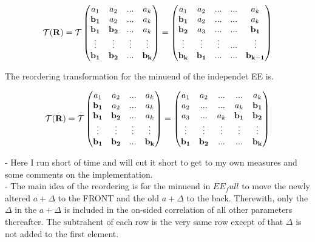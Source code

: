 \documentclass[a4paper,12pt]{article}
\begin{document}
\begin{align}
\mathcal{T}({\bold{R}}) =
\mathcal{T}
\begin{pmatrix}
a_1 & a_2 & ... & a_k \\
\bold{b_1} & a_2 & ... & a_k \\
\bold{b_1} & \bold{b_2} & ... & a_k \\
\vdots & \vdots & \vdots & \vdots\\
\bold{b_1} & \bold{b_2} & ... & \bold{b_k}
\end{pmatrix}
=
\begin{pmatrix}
a_1 & a_2 & ... & ... &  a_k \\
\bold{b_1} & a_2 & ... & ... &  a_k \\
\bold{b_2} & a_3 & ... & ... &  \bold{b_1} \\
\vdots & \vdots & \vdots & ... &  \vdots\\
\bold{b_k} & \bold{b_{1}} & ... & ... &  \bold{b_{k-1}}
\end{pmatrix}
\end{align}


The reordering transformation for the minuend of the independet EE is.



\begin{align}
\mathcal{T}({\bold{R}}) =
\mathcal{T}
\begin{pmatrix}
a_1 & a_2 & ... & a_k \\
\bold{b_1} & a_2 & ... & a_k \\
\bold{b_1} & \bold{b_2} & ... & a_k \\
\vdots & \vdots & \vdots & \vdots\\
\bold{b_1} & \bold{b_2} & ... & \bold{b_k}
\end{pmatrix}
=
\begin{pmatrix}
a_1 & a_2 & ... &  ... & a_k \\
a_2 & ... & ... &    a_k & \bold{b_1} \\
a_3 & ... &  a_k & \bold{b_1}  & \bold{b_2}\\
\vdots & \vdots & \vdots & \vdots & \vdots\\
\bold{b_1} & \bold{b_2} & ... &   ... & \bold{b_k}
\end{pmatrix}
\end{align}


- Here I run short of time and will cut it short to get to my own measures and some comments on the implementation.\\

- The main idea of the reordering is for the minuend in $EE_full$ to move the newly altered $a+\Delta$ to the FRONT and the old $a+\Delta$ to the back. Therewith, only the $\Delta$ in the $a+\Delta$ is included in the on-sided correlation of all other parameters thereafter. The subtrahent of each row is the very same row except of that $\Delta$ is not added to the first element. \\
\end{document}
